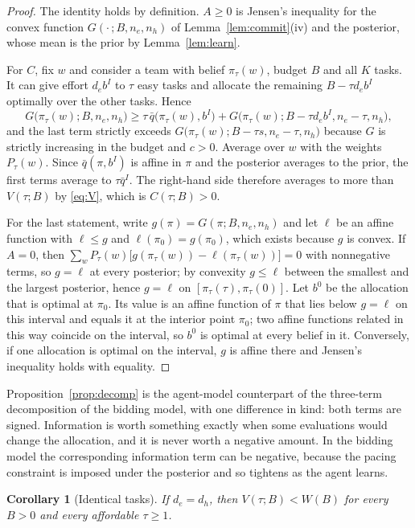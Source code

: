 \documentclass[11pt]{article}
\newtheorem{corollary}{Corollary}
\theoremstyle{definition}
\begin{document}
\begin{proof}
The identity holds by definition. $A\ge0$ is Jensen's inequality for the convex function $G(\cdot\,;B,n_e,n_h)$ of Lemma~\ref{lem:commit}(iv) and the posterior, whose mean is the prior by Lemma~\ref{lem:learn}.

For $C$, fix $w$ and consider a team with belief $\pi_\tau(w)$, budget $B$ and all $K$ tasks. It can give effort $d_e b^I$ to $\tau$ easy tasks and allocate the remaining $B-\tau d_e b^I$ optimally over the other tasks. Hence
\[
G\bigl(\pi_\tau(w);B,n_e,n_h\bigr)\ge\tau\,\bar q\bigl(\pi_\tau(w),b^I\bigr)+G\bigl(\pi_\tau(w);B-\tau d_e b^I,n_e-\tau,n_h\bigr),
\]
and the last term strictly exceeds $G\bigl(\pi_\tau(w);B-\tau s,n_e-\tau,n_h\bigr)$ because $G$ is strictly increasing in the budget and $c>0$. Average over $w$ with the weights $P_\tau(w)$. Since $\bar q(\pi,b^I)$ is affine in $\pi$ and the posterior averages to the prior, the first terms average to $\tau\bar q^I$. The right-hand side therefore averages to more than $V(\tau;B)$ by \eqref{eq:V}, which is $C(\tau;B)>0$.

For the last statement, write $g(\pi)=G(\pi;B,n_e,n_h)$ and let $\ell$ be an affine function with $\ell\le g$ and $\ell(\pi_0)=g(\pi_0)$, which exists because $g$ is convex. If $A=0$, then $\sum_wP_\tau(w)\bigl[g(\pi_\tau(w))-\ell(\pi_\tau(w))\bigr]=0$ with nonnegative terms, so $g=\ell$ at every posterior; by convexity $g\le\ell$ between the smallest and the largest posterior, hence $g=\ell$ on $[\pi_\tau(\tau),\pi_\tau(0)]$. Let $b^0$ be the allocation that is optimal at $\pi_0$. Its value is an affine function of $\pi$ that lies below $g=\ell$ on this interval and equals it at the interior point $\pi_0$; two affine functions related in this way coincide on the interval, so $b^0$ is optimal at every belief in it. Conversely, if one allocation is optimal on the interval, $g$ is affine there and Jensen's inequality holds with equality.
\end{proof}

Proposition~\ref{prop:decomp} is the agent-model counterpart of the three-term decomposition of the bidding model, with one difference in kind: both terms are signed. Information is worth something exactly when some evaluations would change the allocation, and it is never worth a negative amount. In the bidding model the corresponding information term can be negative, because the pacing constraint is imposed under the posterior and so tightens as the agent learns.

\begin{corollary}[Identical tasks]\label{cor:homog}
If $d_e=d_h$, then $V(\tau;B)<W(B)$ for every $B>0$ and every affordable $\tau\ge1$.
\end{corollary}
\end{document}
